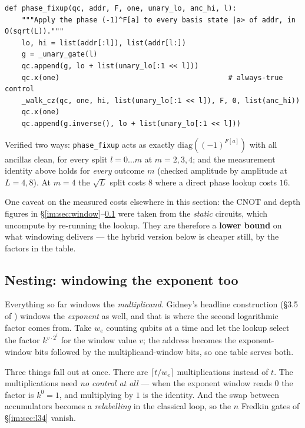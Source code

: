 \documentclass[11pt]{article}
\newcommand{\code}[1]{\texttt{#1}}
\theoremstyle{plain}
\theoremstyle{remark}
\begin{document}
\begin{lstlisting}
def phase_fixup(qc, addr, F, one, unary_lo, anc_hi, l):
    """Apply the phase (-1)^F[a] to every basis state |a> of addr, in O(sqrt(L))."""
    lo, hi = list(addr[:l]), list(addr[l:])
    g = _unary_gate(l)
    qc.append(g, lo + list(unary_lo[:1 << l]))
    qc.x(one)                                        # always-true control
    _walk_cz(qc, one, hi, list(unary_lo[:1 << l]), F, 0, list(anc_hi))
    qc.x(one)
    qc.append(g.inverse(), lo + list(unary_lo[:1 << l]))
\end{lstlisting}

\noindent
Verified two ways: \code{phase\_fixup} acts as exactly $\mathrm{diag}((-1)^{F[a]})$ with all
ancillas clean, for every split $l=0\ldots m$ at $m=2,3,4$; and the measurement identity above
holds for \emph{every} outcome $m$ (checked amplitude by amplitude at $L=4,8$). At $m=4$ the
$\sqrt L$ split costs $8$ where a direct phase lookup costs $16$.

\medskip\noindent
One caveat on the measured costs elsewhere in this section: the CNOT and depth figures in
\S\ref{im:sec:window}--\ref{im:sec:nested} were taken from the \emph{static} circuits, which uncompute by
re-running the lookup. They are therefore a \textbf{lower bound} on what windowing delivers --- the
hybrid version below is cheaper still, by the factors in the table.

\subsection{Nesting: windowing the exponent too}\label{im:sec:nested}

Everything so far windows the \emph{multiplicand}. Gidney's headline construction (\S3.5 of
\cite{gidney-window}) windows the \emph{exponent} as well, and that is where the second logarithmic
factor comes from. Take $w_e$ counting qubits at a time and let the lookup select the factor
$k^{v\cdot 2^i}$ for the window value $v$; the address becomes the exponent-window bits followed by
the multiplicand-window bits, so one table serves both.

Three things fall out at once. There are $\lceil t/w_e\rceil$ multiplications instead of $t$. The
multiplications need \emph{no control at all} --- when the exponent window reads $0$ the factor is
$k^0=1$, and multiplying by $1$ is the identity. And the swap between accumulators becomes a
\emph{relabelling} in the classical loop, so the $n$ Fredkin gates of \S\ref{im:sec:l34} vanish.
\end{document}
